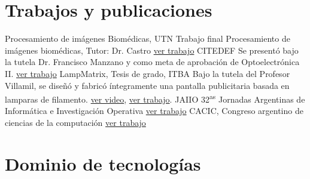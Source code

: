 \documentclass[11pt,a4paper,sans]{moderncv}  %
\begin{document}
\section{Trabajos y publicaciones}
                                           {Procesamiento de imágenes Biomédicas, UTN}                    {}{}{Trabajo final Procesamiento de imágenes biomédicas, Tutor: Dr. Castro                         \href{http://disenioconingenio.com.ar/shop/docs/Final_ooffice.pdf}                        {ver trabajo}}
                              {CITEDEF}                                 {}{}{Se presentó bajo la tutela Dr. Francisco Manzano y como meta de aprobación de Optoelectrónica II.               \href{http://disenioconingenio.com.ar/shop/docs/citedef_2008.pdf}                         {ver trabajo}}
       {LampMatrix, Tesis de grado, ITBA}                       {}{}{Bajo la tutela del Profesor Villamil, se diseñó y fabricó íntegramente una pantalla publicitaria basada en lamparas de filamento.    \href{http://www.youtube.com/watch?v=Usx4YUNpknc}{ver video}, \href{http://disenioconingenio.com.ar/shop/docs/lampmatrix.pdf}    {ver trabajo}.}
              {JAIIO 32\textsuperscript{as} Jornadas Argentinas de Informática e Investigación Operativa}  {}{}                                                  {\href{http://disenioconingenio.com.ar/shop/docs/jaiio2003.pdf}                        {ver trabajo}}
                        {CACIC, Congreso argentino de ciencias de la computación}               {}{}                                                  {\href{http://disenioconingenio.com.ar/shop/docs/cacic2003.pdf}                        {ver trabajo}}
\section{Dominio de tecnologías}
\end{document}
